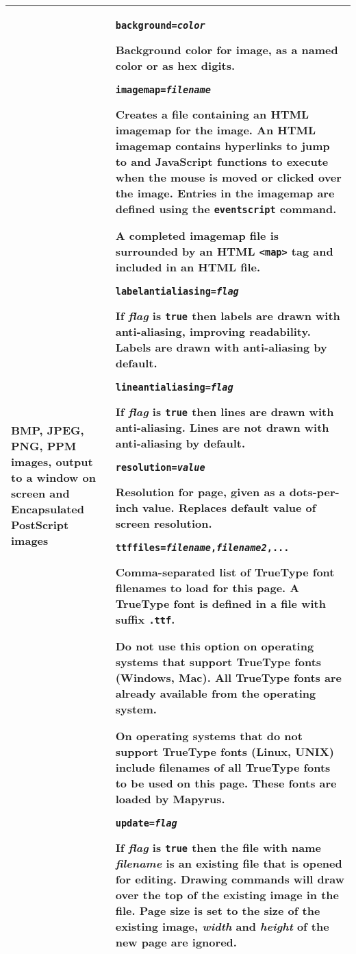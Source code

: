 \begin{longtable}{|p{4cm}|p{10cm}|}
\hline

BMP, JPEG, PNG, PPM images, output to a window on screen
and Encapsulated PostScript images &

\texttt{background=\textit{color}}

Background color for image, as a named color or as hex digits.

\vspace{10pt}
\texttt{imagemap=\textit{filename}}

Creates a file containing an HTML imagemap for the image.
An HTML imagemap contains hyperlinks to jump to and JavaScript
functions to execute when the mouse is moved or clicked over the image.
Entries in the imagemap are defined using the \texttt{eventscript} command.

A completed imagemap file is surrounded by an HTML \texttt{<map>} tag
and included in an HTML file.

\vspace{10pt}
\texttt{labelantialiasing=\textit{flag}}

If \textit{flag} is \texttt{true} then
labels are drawn with anti-aliasing, improving readability.
Labels are drawn with anti-aliasing by default.

\vspace{10pt}
\texttt{lineantialiasing=\textit{flag}}

If \textit{flag} is \texttt{true} then
lines are drawn with anti-aliasing.
Lines are not drawn with anti-aliasing by default.

\vspace{10pt}
\texttt{resolution=\textit{value}}

Resolution for page, given as a dots-per-inch value.  Replaces
default value of screen resolution.

\vspace{10pt}
\texttt{ttffiles=\textit{filename},\textit{filename2},...}

Comma-separated list of TrueType font filenames
to load for this page.
A TrueType font is defined in a file
with suffix \texttt{.ttf}.

Do not use this option on operating systems that support
TrueType fonts (Windows, Mac).  All TrueType
fonts are already available from the operating system.

On operating systems that do not support TrueType fonts
(Linux, UNIX) include filenames of all TrueType
fonts to be used on this page.  These fonts are loaded
by Mapyrus.

\vspace{10pt}
\texttt{update=\textit{flag}}

If \textit{flag} is \texttt{true} then the file with name
\textit{filename} is an existing file that is opened for editing.
Drawing commands will draw over the top of the existing image
in the file.
Page size is set to the size of the existing image,
\textit{width} and \textit{height} of the new page are ignored.  \\

\hline

\end{longtable}


